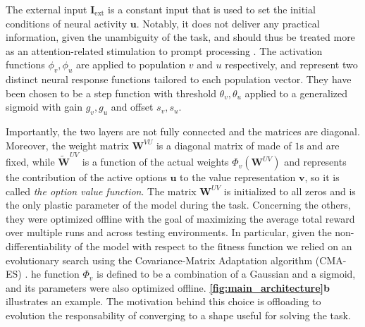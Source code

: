 \noindent The external input $\textbf{I}_{\text{ext}}$ is a constant input that is used to set the initial conditions of neural activity $\textbf{u}$.
Notably, it does not deliver any practical information, given the unambiguity of the task, and should thus be treated more as an attention-related stimulation to prompt processing \cite{yantisNeuralBasisSelective2008}.
The activation functions $\phi_{v},\phi_{u}$ are applied to population $v$ and $u$ respectively, and represent two distinct neural response functions tailored to each population vector.
They have been chosen to be a step function with threshold $\theta_{v},\theta_{u}$ applied to a generalized sigmoid with gain $g_{v},g_{u}$ and offset $s_{v},s_{u}$.


Importantly, the two layers are not fully connected and the matrices are diagonal. Moreover, the weight matrix $\textbf{W}^{VU}$ is a diagonal matrix of made of $1$s and are fixed, while $\widetilde{\textbf{W}}^{UV}$ is a function of the actual weights $\Phi_{v}(\textbf{W}^{UV})$ and represents the contribution of the active options $\textbf{u}$ to the value representation $\textbf{v}$, so it is called \textit{ the option value function}.
The matrix $\textbf{W}^{UV}$ is initialized to all zeros and is the only plastic parameter of the model during the task.
Concerning the others, they were optimized offline with the goal of maximizing the average total reward over multiple runs and across testing environments.
In particular, given the non-differentiability of the model with respect to the fitness function we relied on an evolutionary search using the Covariance-Matrix Adaptation algorithm (CMA-ES) \cite{igelCovarianceMatrixAdaptation2007}.
he function $\Phi_{v}$ is defined to be a combination of a Gaussian and a sigmoid, and its parameters were also optimized offline. \textbf{\ref{fig:main_architecture}b} illustrates an example.
The motivation behind this choice is offloading to evolution the responsability of converging to a shape useful for solving the task.

